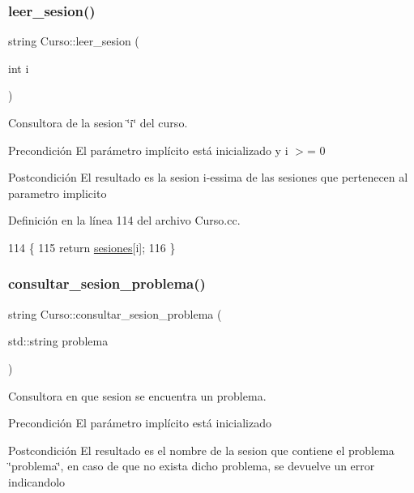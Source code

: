\subsubsection{\texorpdfstring{leer\+\_\+sesion()}{leer\_sesion()}}
{\footnotesize\ttfamily string Curso\+::leer\+\_\+sesion (\begin{DoxyParamCaption}\item[{int}]{i }\end{DoxyParamCaption})}



Consultora de la sesion \char`\"{}i\char`\"{} del curso. 

\begin{DoxyPrecond}{Precondición}
El parámetro implícito está inicializado y i $>$= 0 
\end{DoxyPrecond}
\begin{DoxyPostcond}{Postcondición}
El resultado es la sesion i-\/essima de las sesiones que pertenecen al parametro implicito 
\end{DoxyPostcond}


Definición en la línea 114 del archivo Curso.\+cc.


\begin{DoxyCode}
114                                \{
115   \textcolor{keywordflow}{return} \mbox{\hyperlink{class_curso_a53e0e57eb6d683a83752082d633a03bc}{sesiones}}[i];
116 \}
\end{DoxyCode}
\mbox{\label{class_curso_a84e25406614d5e938909385cf860d3f8}} 
\subsubsection{\texorpdfstring{consultar\+\_\+sesion\+\_\+problema()}{consultar\_sesion\_problema()}}
{\footnotesize\ttfamily string Curso\+::consultar\+\_\+sesion\+\_\+problema (\begin{DoxyParamCaption}\item[{std\+::string}]{problema }\end{DoxyParamCaption})}



Consultora en que sesion se encuentra un problema. 

\begin{DoxyPrecond}{Precondición}
El parámetro implícito está inicializado 
\end{DoxyPrecond}
\begin{DoxyPostcond}{Postcondición}
El resultado es el nombre de la sesion que contiene el problema \char`\"{}problema\char`\"{}, en caso de que no exista dicho problema, se devuelve un error indicandolo 
\end{DoxyPostcond}



